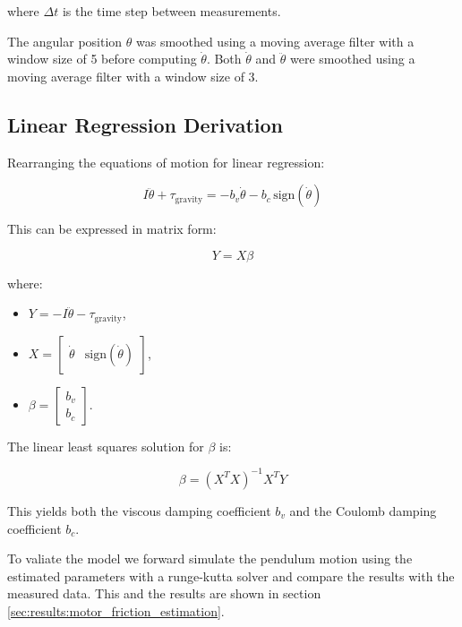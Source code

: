 where \(\Delta t\) is the time step between measurements.

The angular position \(\theta\) was smoothed using a moving average filter with a window size of 5 before computing \(\dot{\theta}\). Both \(\dot{\theta}\) and \(\ddot{\theta}\) were smoothed using a moving average filter with a window size of 3.

\subsection{Linear Regression Derivation}
Rearranging the equations of motion for linear regression:

\[
I \ddot{\theta} + \tau_{\text{gravity}} = -b_v \dot{\theta} - b_c \, \text{sign}(\dot{\theta})
\]

This can be expressed in matrix form:

\[
Y = X \beta
\]

where:
\begin{itemize}
    \item \( Y = -I \ddot{\theta} - \tau_{\text{gravity}} \),
    \item \( X = \begin{bmatrix} \dot{\theta} & \text{sign}(\dot{\theta}) \end{bmatrix} \),
    \item \( \beta = \begin{bmatrix} b_v \\ b_c \end{bmatrix} \).
\end{itemize}

The linear least squares solution for \( \beta \) is:

\[
\beta = (X^T X)^{-1} X^T Y
\]

This yields both the viscous damping coefficient \( b_v \) and the Coulomb damping coefficient \( b_c \).

To valiate the model we forward simulate the pendulum motion using the estimated parameters with a runge-kutta solver and compare the results with the measured data. This and the results are shown in section \ref{sec:results:motor_friction_estimation}.
